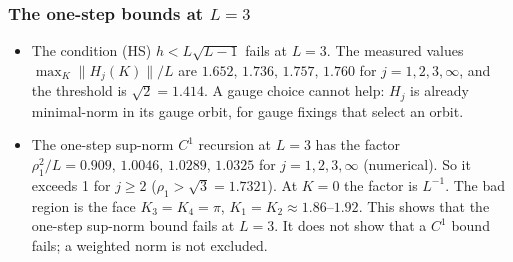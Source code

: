 \subsubsection{The one-step bounds at $L=3$}\label{sec:refuted}
\begin{itemize}
\item The condition (HS) $h<L\sqrt{L-1}$ fails at $L=3$. The measured values $\max_K\|H_j(K)\|/L$ are $1.652,\,1.736,\,1.757,\,1.760$ for $j=1,2,3,\infty$, and the threshold is $\sqrt2=1.414$. A gauge choice cannot help: $H_j$ is already minimal-norm in its gauge orbit, for gauge fixings that select an orbit.
\item The one-step sup-norm $C^1$ recursion at $L=3$ has the factor $\rho_1^2/L=0.909,\,1.0046,\,1.0289,\,1.0325$ for $j=1,2,3,\infty$ (numerical). So it exceeds 1 for $j\ge2$ ($\rho_1>\sqrt3=1.7321$). At $K=0$ the factor is $L^{-1}$. The bad region is the face $K_3=K_4=\pi$, $K_1=K_2\approx1.86$--$1.92$. This shows that the one-step sup-norm bound fails at $L=3$. It does not show that a $C^1$ bound fails; a weighted norm is not excluded.
\end{itemize}

